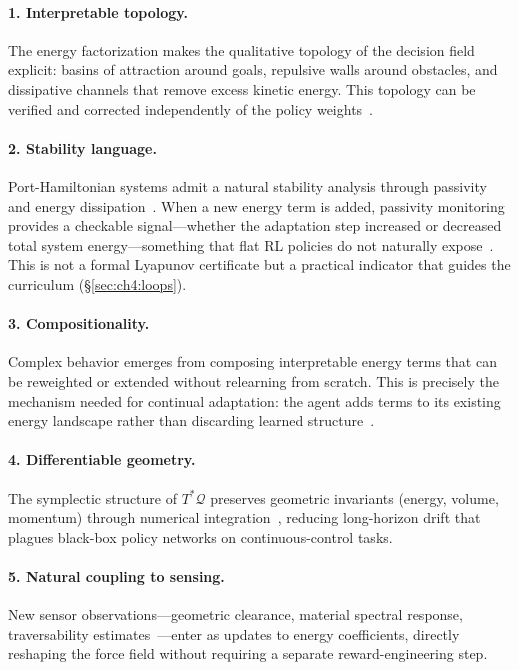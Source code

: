 \paragraph{1. Interpretable topology.}
The energy factorization makes the qualitative topology of the decision
field explicit: basins of attraction around goals, repulsive walls around
obstacles, and dissipative channels that remove excess kinetic energy.
This topology can be verified and corrected independently of the policy
weights~\citep{greydanus2019hamiltonian}.

\paragraph{2. Stability language.}
Port-Hamiltonian systems admit a natural stability analysis through passivity
and energy dissipation~\citep{desai2021porthamiltonian}.
When a new energy term is added, passivity monitoring provides a checkable
signal—whether the adaptation step increased or decreased total system
energy—something that flat RL policies do not naturally
expose~\citep{roth2025stable}.
This is not a formal Lyapunov certificate but a practical indicator
that guides the curriculum (§\ref{sec:ch4:loops}).

\paragraph{3. Compositionality.}
Complex behavior emerges from composing interpretable energy terms that can
be reweighted or extended without relearning from scratch.
This is precisely the mechanism needed for continual adaptation: the agent
adds terms to its existing energy landscape rather than discarding
learned structure~\citep{rolnick2019experience}.

\paragraph{4. Differentiable geometry.}
The symplectic structure of $T^*\mathcal{Q}$ preserves geometric invariants
(energy, volume, momentum) through numerical
integration~\citep{reich1996symplectic}, reducing long-horizon drift that
plagues black-box policy networks on continuous-control tasks.

\paragraph{5. Natural coupling to sensing.}
New sensor observations—geometric clearance, material spectral response,
traversability estimates~\citep{rugd2019,rellis2020}—enter as updates to
energy coefficients, directly reshaping the force field without requiring
a separate reward-engineering step.

